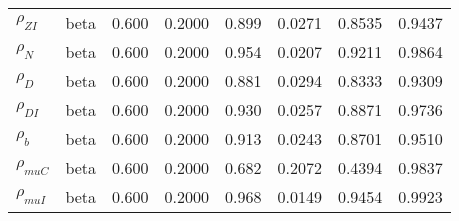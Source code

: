 \begin{center}
\begin{longtable}{llcccccc}
${\rho_{ZI}}$ & beta &   0.600 & 0.2000 &   0.899& 0.0271 &  0.8535 &  0.9437 \\ 
${\rho_N}$ & beta &   0.600 & 0.2000 &   0.954& 0.0207 &  0.9211 &  0.9864 \\ 
${\rho_D}$ & beta &   0.600 & 0.2000 &   0.881& 0.0294 &  0.8333 &  0.9309 \\ 
${\rho_{DI}}$ & beta &   0.600 & 0.2000 &   0.930& 0.0257 &  0.8871 &  0.9736 \\ 
${\rho_b}$ & beta &   0.600 & 0.2000 &   0.913& 0.0243 &  0.8701 &  0.9510 \\ 
${\rho_{muC}}$ & beta &   0.600 & 0.2000 &   0.682& 0.2072 &  0.4394 &  0.9837 \\ 
${\rho_{muI}}$ & beta &   0.600 & 0.2000 &   0.968& 0.0149 &  0.9454 &  0.9923 \\ 
\end{longtable}
 \end{center}
